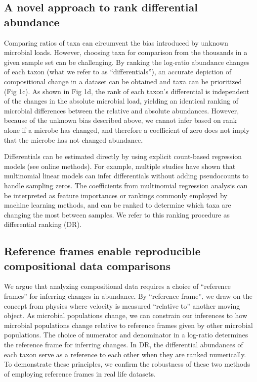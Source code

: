 \subsection{A novel approach to rank differential abundance}
Comparing ratios of taxa can circumvent the bias introduced by unknown microbial loads. However, choosing taxa for comparison from the thousands in a given sample set can be challenging. By ranking the log-ratio abundance changes of each taxon (what we refer to as “differentials”), an accurate depiction of compositional change in a dataset can be obtained and taxa can be prioritized (Fig 1c). As shown in Fig 1d, the rank of each taxon’s differential is independent of the changes in the absolute microbial load, yielding an identical ranking of microbial differences between the relative and absolute abundances. However, because of the unknown bias described above, we cannot infer based on rank alone if a microbe has changed, and therefore a coefficient of zero does not imply that the microbe has not changed abundance.

Differentials can be estimated directly by using explicit count-based regression models (see online methods). For example, multiple studies have shown that multinomial linear models can infer differentials without adding pseudocounts to handle sampling zeros\cite{Silverman2018-ql,Aijo2018-jp, Grantham2017-gv,Xia2013-nd}. The coefficients from multinomial regression analysis can be interpreted as feature importances or rankings commonly employed by machine learning methods, and can be ranked to determine which taxa are changing the most between samples. We refer to this ranking procedure as differential ranking (DR).

\subsection{Reference frames enable reproducible compositional data comparisons}
We argue that analyzing compositional data requires a choice of “reference frames” for inferring changes in abundance. By ``reference frame'', we draw on the concept from physics where velocity is measured ``relative to'' another moving object. As microbial populations change, we can constrain our inferences to how microbial populations change relative to reference frames given by other microbial populations. The choice of numerator and denominator in a log-ratio determines the reference frame for inferring changes. In DR, the differential abundances of each taxon serve as a reference to each other when they are ranked numerically. To demonstrate these principles, we confirm the robustness of these two methods of employing reference frames in real life datasets.


